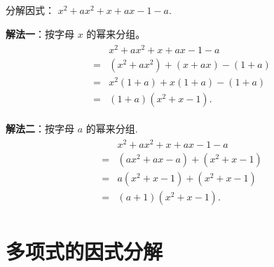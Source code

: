 \begin{example}[殊途同归]
	分解因式： $x^{2}+a x^{2}+x+a x-1-a$.
\end{example}
\begin{solution}
	\textbf{解法一}：按字母 $x$ 的幂来分组。
	\begin{align*}
		\begin{aligned}
			  & x^{2}+a x^{2}+x+a x-1-a                  \\
			= & \left(x^{2}+a x^{2}\right)+(x+a x)-(1+a) \\
			= & x^{2}(1+a)+x(1+a)-(1+a)                  \\
			= & (1+a)\left(x^{2}+x-1\right) .
		\end{aligned}
	\end{align*}

	\textbf{解法二}：按字母 $a$ 的幂来分组.
	\begin{align*}
		\begin{aligned}
			  & x^{2}+a x^{2}+x+a x-1-a                           \\
			= & \left(a x^{2}+a x-a\right)+\left(x^{2}+x-1\right) \\
			= & a\left(x^{2}+x-1\right)+\left(x^{2}+x-1\right)    \\
			= & (a+1)\left(x^{2}+x-1\right) .
		\end{aligned}
	\end{align*}
\end{solution}



\section{多项式的因式分解}
